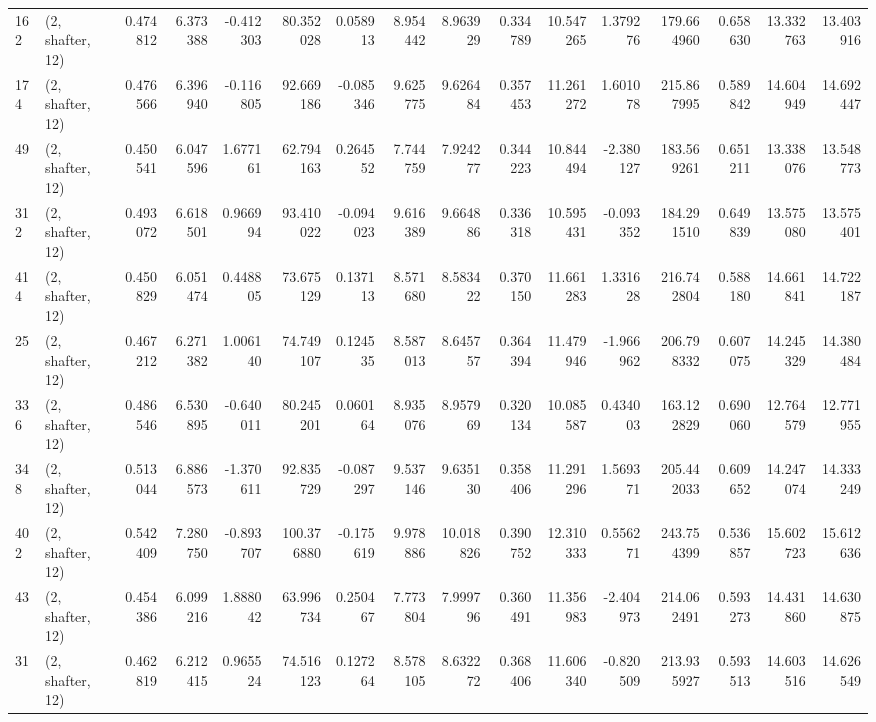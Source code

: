 \begin{tabular}{llrrrrrrrrrrrrrr}
162 &  (2, shafter, 12) &   0.474812 &   6.373388 &  -0.412303 &    80.352028 &   0.058913 &   8.954442 &   8.963929 &  0.334789 &  10.547265 &   1.379276 &   179.664960 &   0.658630 &  13.332763 &  13.403916 \\
174 &  (2, shafter, 12) &   0.476566 &   6.396940 &  -0.116805 &    92.669186 &  -0.085346 &   9.625775 &   9.626484 &  0.357453 &  11.261272 &   1.601078 &   215.867995 &   0.589842 &  14.604949 &  14.692447 \\
49  &  (2, shafter, 12) &   0.450541 &   6.047596 &   1.677161 &    62.794163 &   0.264552 &   7.744759 &   7.924277 &  0.344223 &  10.844494 &  -2.380127 &   183.569261 &   0.651211 &  13.338076 &  13.548773 \\
312 &  (2, shafter, 12) &   0.493072 &   6.618501 &   0.966994 &    93.410022 &  -0.094023 &   9.616389 &   9.664886 &  0.336318 &  10.595431 &  -0.093352 &   184.291510 &   0.649839 &  13.575080 &  13.575401 \\
414 &  (2, shafter, 12) &   0.450829 &   6.051474 &   0.448805 &    73.675129 &   0.137113 &   8.571680 &   8.583422 &  0.370150 &  11.661283 &   1.331628 &   216.742804 &   0.588180 &  14.661841 &  14.722187 \\
25  &  (2, shafter, 12) &   0.467212 &   6.271382 &   1.006140 &    74.749107 &   0.124535 &   8.587013 &   8.645757 &  0.364394 &  11.479946 &  -1.966962 &   206.798332 &   0.607075 &  14.245329 &  14.380484 \\
336 &  (2, shafter, 12) &   0.486546 &   6.530895 &  -0.640011 &    80.245201 &   0.060164 &   8.935076 &   8.957969 &  0.320134 &  10.085587 &   0.434003 &   163.122829 &   0.690060 &  12.764579 &  12.771955 \\
348 &  (2, shafter, 12) &   0.513044 &   6.886573 &  -1.370611 &    92.835729 &  -0.087297 &   9.537146 &   9.635130 &  0.358406 &  11.291296 &   1.569371 &   205.442033 &   0.609652 &  14.247074 &  14.333249 \\
402 &  (2, shafter, 12) &   0.542409 &   7.280750 &  -0.893707 &   100.376880 &  -0.175619 &   9.978886 &  10.018826 &  0.390752 &  12.310333 &   0.556271 &   243.754399 &   0.536857 &  15.602723 &  15.612636 \\
43  &  (2, shafter, 12) &   0.454386 &   6.099216 &   1.888042 &    63.996734 &   0.250467 &   7.773804 &   7.999796 &  0.360491 &  11.356983 &  -2.404973 &   214.062491 &   0.593273 &  14.431860 &  14.630875 \\
31  &  (2, shafter, 12) &   0.462819 &   6.212415 &   0.965524 &    74.516123 &   0.127264 &   8.578105 &   8.632272 &  0.368406 &  11.606340 &  -0.820509 &   213.935927 &   0.593513 &  14.603516 &  14.626549 \\

\end{tabular}
